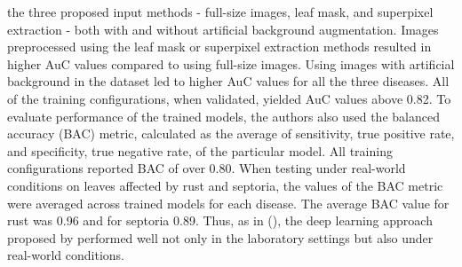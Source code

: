 \documentclass{BachelorBUI}
\begin{document}
the three proposed input methods - full-size images, leaf mask, and superpixel extraction - both with and without artificial background augmentation. Images preprocessed using the leaf mask or superpixel extraction methods resulted in higher AuC values compared to using full-size images. Using images with artificial background in the dataset led to higher AuC values for all the three diseases. All of the training configurations, when validated, yielded AuC values above 0.82. To evaluate performance of the trained models, the authors also used the balanced accuracy (BAC) metric, calculated as the average of sensitivity, true positive rate, and specificity, true negative rate, of the particular model. All training configurations reported BAC of over 0.80. When testing under real-world conditions on leaves affected by rust and septoria, the values of the BAC metric were averaged across trained models for each disease. The average BAC value for rust was 0.96 and for septoria 0.89. Thus, as in (\cite{Johannes:2017}), the deep learning approach proposed by \textcite{Picon:2019} performed well not only in the laboratory settings but also under real-world conditions.
\end{document}
